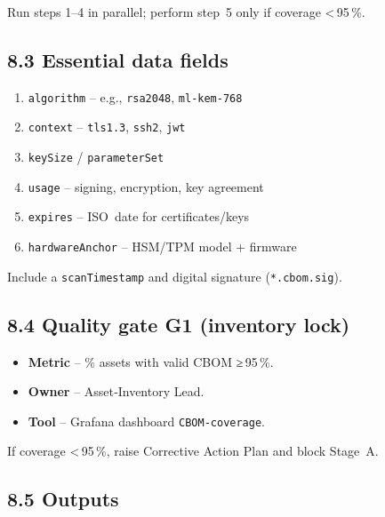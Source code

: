 \documentclass[
  english,
]{article}
\providecommand{\tightlist}{%
  \setlength{\itemsep}{0pt}\setlength{\parskip}{0pt}}
\begin{document}
Run steps 1--4 in parallel; perform step~5 only if coverage
\textless\,95\,\%.

\subsection{8.3 Essential data fields}\label{essential-data-fields}

\begin{enumerate}
\def\labelenumi{\arabic{enumi}.}
\tightlist
\item
  \texttt{algorithm} -- e.g., \texttt{rsa2048}, \texttt{ml‑kem‑768}\\
\item
  \texttt{context} -- \texttt{tls1.3}, \texttt{ssh2}, \texttt{jwt}\\
\item
  \texttt{keySize} / \texttt{parameterSet}\\
\item
  \texttt{usage} -- signing, encryption, key agreement\\
\item
  \texttt{expires} -- ISO~date for certificates/keys\\
\item
  \texttt{hardwareAnchor} -- HSM/TPM model + firmware
\end{enumerate}

Include a \texttt{scanTimestamp} and digital signature
(\texttt{*.cbom.sig}).

\subsection{8.4 Quality gate G1 (inventory
lock)}\label{quality-gate-g1-inventory-lock}

\begin{itemize}
\tightlist
\item
  \textbf{Metric} -- \% assets with valid CBOM ≥\,95\,\%.
\item
  \textbf{Owner} -- Asset‑Inventory Lead.
\item
  \textbf{Tool} -- Grafana dashboard \texttt{CBOM‑coverage}.
\end{itemize}

If coverage \textless\,95\,\%, raise Corrective Action Plan and block
Stage~A.

\subsection{8.5 Outputs}\label{outputs}
\end{document}
